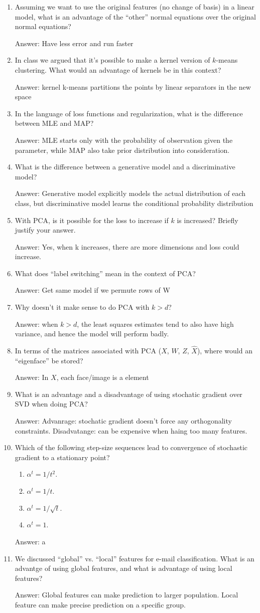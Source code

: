 \documentclass{article}
\def\ans#1{\par\gre{Answer: #1}}
\def\gre#1{{\color{gre}#1}}
\def\enum#1{\begin{enumerate}#1\end{enumerate}}
\begin{document}
\enum{
\item Assuming we want to use the original features (no change of basis) in a linear model, what is an advantage of the ``other'' normal equations over the original normal equations?
\ans{Have less error and run faster}
\item In class we argued that it's possible to make a kernel version of $k$-means clustering. What would an advantage of kernels be in this context?
\ans{ kernel k-means partitions the points by linear separators in the new space}
\item In the language of loss functions and regularization, what is the difference between MLE and MAP?
\ans{MLE starts only with the probability of observation given the parameter, while MAP also  take prior distribution into consideration.}
\item What is the difference between a generative model and a discriminative model?
\ans{Generative model ‌explicitly models the actual distribution of each class, but discriminative model ‌learns the conditional probability distribution}
\item With PCA, is it possible for the loss to increase if $k$ is increased? Briefly justify your answer.
\ans{Yes, when k increases, there are more dimensions and loss could increase.}
\item What does ``label switching'' mean in the context of PCA?
\ans{Get same model if we permute rows of W}
\item Why doesn't it make sense to do PCA with $k > d$?
\ans{when $k > d$, the least squares estimates tend to also have high  variance, and hence the model will perform badly.}
\item In terms of the matrices associated with PCA ($X$, $W$, $Z$, $\hat{X}$), where would an ``eigenface'' be stored?
\ans{In $X$, each face/image is a element}
\item What is an advantage and a disadvantage of using stochatic gradient over SVD when doing PCA?
\ans{Advanrage: stochatic gradient doesn't force any orthogonality constraints. Disadvatange: can be expensive when haing too many features.}
\item Which of the following step-size sequences lead to convergence of stochastic gradient to a stationary point?
\enum{
\item $\alpha^t = 1/t^2$.
\item $\alpha^t = 1/t$.
\item $\alpha^t = 1/\sqrt{t}$.
\item $\alpha^t = 1$.
}
\ans{a}
\item We discussed ``global'' vs. ``local'' features for e-mail classification. What is an advantge of using global features, and what is advantage of using local features?
\ans{Global features can make prediction to larger population. Local feature can make precise prediction on a specific group.}
}
\end{document}
